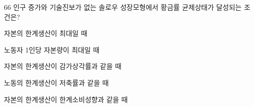 \begin{question}{66}
인구 증가와 기술진보가 없는 솔로우 성장모형에서 황금률 균제상태가 달성되는 조건은?
\begin{choices}
  \item 자본의 한계생산이 최대일 때
  \item 노동자 1인당 자본량이 최대일 때
  \item 자본의 한계생산이 감가상각률과 같을 때
  \item 노동의 한계생산이 저축률과 같을 때
  \item 자본의 한계생산이 한계소비성향과 같을 때
\end{choices}
\end{question}
